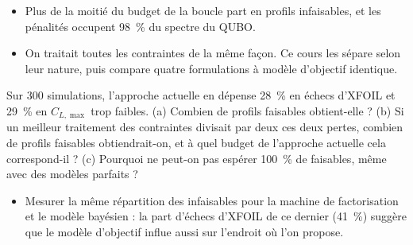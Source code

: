 \begin{resultat}
\begin{itemize}
\item Plus de la moitié du budget de la boucle part en profils infaisables, et les pénalités occupent 98~\% du spectre du QUBO.
\item On traitait toutes les contraintes de la même façon. Ce cours les sépare selon leur nature, puis compare quatre formulations à modèle d'objectif identique.
\end{itemize}
\end{resultat}

\exercices
\begin{exercice}\label{ex:constat-budget}
Sur 300 simulations, l'approche actuelle en dépense 28~\% en échecs d'XFOIL et 29~\% en $C_{L,\max}$ trop faibles. (a) Combien de profils faisables obtient-elle ? (b) Si un meilleur traitement des contraintes divisait par deux ces deux pertes, combien de profils faisables obtiendrait-on, et à quel budget de l'approche actuelle cela correspond-il ? (c) Pourquoi ne peut-on pas espérer 100~\% de faisables, même avec des modèles parfaits ?
\end{exercice}

\begin{pistes}
\begin{itemize}
\item Mesurer la même répartition des infaisables pour la machine de factorisation et le modèle bayésien : la part d'échecs d'XFOIL de ce dernier (41~\%) suggère que le modèle d'objectif influe aussi sur l'endroit où l'on propose.
\end{itemize}
\end{pistes}
